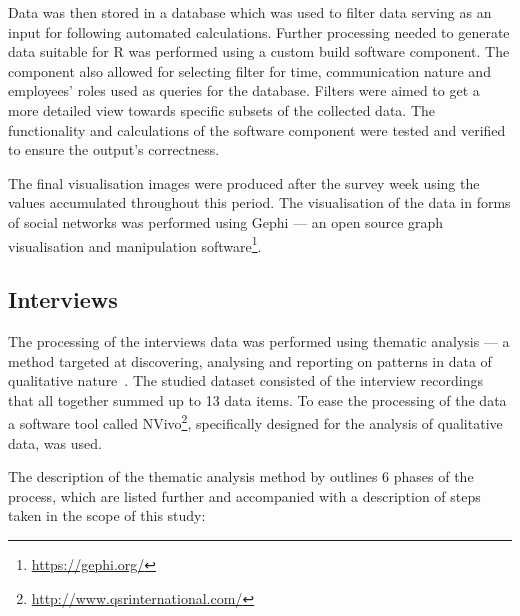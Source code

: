 Data was then stored in a database which was used to filter data serving as an input for following automated calculations. Further processing needed to generate data suitable for R was performed using a custom build software component. The component also allowed for selecting filter for time, communication nature and employees' roles used as queries for the database. Filters were aimed to get a more detailed view towards specific subsets of the collected data. The functionality and calculations of the software component were tested and verified to ensure the output's correctness.

The final visualisation images were produced after the survey week using the values accumulated throughout this period. The visualisation of the data in forms of social networks was performed using Gephi — an open source graph visualisation and manipulation software\footnote{\url{https://gephi.org/}}.

\subsection{Interviews}

The processing of the interviews data was performed using thematic analysis — a method targeted at discovering, analysing and reporting on patterns in data of qualitative nature~\citep{braun2006using}. The studied dataset consisted of the interview recordings that all together summed up to 13 data items. To ease the processing of the data a software tool called NVivo\footnote{\url{http://www.qsrinternational.com/}}, specifically designed for the analysis of qualitative data, was used.


The description of the thematic analysis method by \citet{braun2006using} outlines 6 phases of the process, which are listed further and accompanied with a description of steps taken in the scope of this study:

